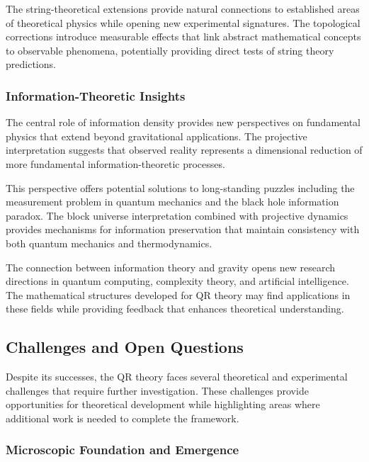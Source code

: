 The string-theoretical extensions provide natural connections to established areas of theoretical physics while opening new experimental signatures. The topological corrections introduce measurable effects that link abstract mathematical concepts to observable phenomena, potentially providing direct tests of string theory predictions.

\subsubsection{Information-Theoretic Insights}
\label{subsubsec:information-insights}

The central role of information density provides new perspectives on fundamental physics that extend beyond gravitational applications. The projective interpretation suggests that observed reality represents a dimensional reduction of more fundamental information-theoretic processes.

This perspective offers potential solutions to long-standing puzzles including the measurement problem in quantum mechanics and the black hole information paradox. The block universe interpretation combined with projective dynamics provides mechanisms for information preservation that maintain consistency with both quantum mechanics and thermodynamics.

The connection between information theory and gravity opens new research directions in quantum computing, complexity theory, and artificial intelligence. The mathematical structures developed for QR theory may find applications in these fields while providing feedback that enhances theoretical understanding.

\subsection{Challenges and Open Questions}
\label{subsec:challenges-questions}

Despite its successes, the QR theory faces several theoretical and experimental challenges that require further investigation. These challenges provide opportunities for theoretical development while highlighting areas where additional work is needed to complete the framework.

\subsubsection{Microscopic Foundation and Emergence}
\label{subsubsec:microscopic-foundation}

